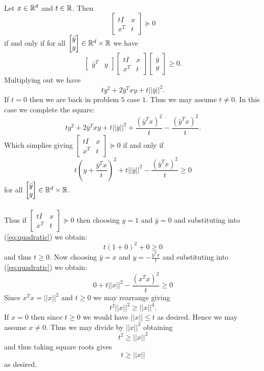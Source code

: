 \documentclass[letterpaper,12pt,oneside,onecolumn]{article}
\begin{document}
\paragraph{}
Let $x\in \mathbb{R}^d$ and $t\in \mathbb{R}$. Then
$$\begin{bmatrix}tI & x \\ x^T & t \end{bmatrix} \succcurlyeq 0$$ if and only if for all $\begin{bmatrix} \bar{y} \\y \end{bmatrix} \in \mathbb{R}^d \times \mathbb{R}$ we have
$$\begin{bmatrix}\bar{y}^T & y \end{bmatrix} \begin{bmatrix}tI & x \\ x^T & t \end{bmatrix} \begin{bmatrix} \bar{y} \\y \end{bmatrix} \geq 0.$$
Multiplying out we have
$$ty^2 + 2\bar{y}^Txy + t||\bar{y}||^2.$$
If $t = 0$ then we are back in problem $5$ case $1$. Thus we may assume $t\neq 0$. In this case we complete the square:
$$ty^2 + 2\bar{y}^Txy + t||\bar{y}||^2 + \frac{(\bar{y}^Tx)^2}{t}-\frac{(\bar{y}^Tx)^2}{t}.$$
Which simplies giving $\begin{bmatrix}tI & x \\ x^T & t \end{bmatrix} \succcurlyeq 0$ if and only if
\begin{equation}t(y+\frac{\bar{y}^Tx}{t})^2 + t||\bar{y}||^2 - \frac{(\bar{y}^Tx)^2}{t} \geq 0\label{eq:quadratic}\end{equation}
for all $\begin{bmatrix} \bar{y} \\y \end{bmatrix} \in \mathbb{R}^d \times \mathbb{R}$.
\paragraph{}
Thus if $\begin{bmatrix}tI & x \\ x^T & t \end{bmatrix} \succcurlyeq 0$ then choosing $y =1$ and $\bar{y} = 0$ and substituting into (\ref{eq:quadratic}) we obtain:
$$t(1 + 0)^2 + 0 \geq 0$$
and thus $t \geq 0$. Now choosing $\bar{y} = x$ and $y = -\frac{\bar{y}^Tx}{t}$ and substituting into (\ref{eq:quadratic}) we obtain:
$$0 + t||x||^2 - \frac{(x^Tx)^2}{t} \geq 0$$
Since $x^Tx = ||x||^2$ and $t\geq 0$ we may rearrange giving
$$t^2||x||^2 \geq ||x||^4.$$
If $x = 0$ then since $t \geq 0$ we would have $||x|| \leq t$ as desired. Hence we may assume $x \neq 0$. Thus we may divide by $||x||^2$ obtaining
$$t^2 \geq ||x||^2$$
and thus taking square roots gives
$$t \geq ||x||$$ as desired.
\end{document}
